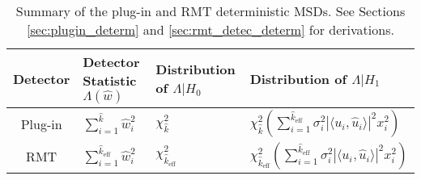 \begin{table*}[ht!]
\centering
\begin{tabular}{clll}\toprule
 Detector & Detector Statistic $\Lambda(\widehat{w})$  & Distribution of $\Lambda|H_0$ & Distribution of $\Lambda|H_1$\\
\midrule
Plug-in & $\sum_{i=1}^{\widehat{k}}\widehat{w}_i^2$ & $\chi^2_{\widehat{k}}$ & $\chi^2_{\widehat{k}}\left(\sum_{i=1}^{\widehat{k}_{\text{eff}}}\sigma_i^2|\langle u_i,\widehat{u}_i\rangle|^2x_i^2\right)$\\
 RMT& $\sum_{i=1}^{\widehat{k}_{\text{eff}}}\widehat{w}_i^2$ & $\chi^2_{\widehat{k}_{\text{eff}}}$ & $\chi^2_{\widehat{k}_{\text{eff}}}\left(\sum_{i=1}^{\widehat{k}_{\text{eff}}}\sigma_i^2|\langle u_i,\widehat{u}_i\rangle|^2x_i^2\right)$\\
\bottomrule
\end{tabular}
\caption{Summary of the plug-in and RMT deterministic MSDs. See Sections \ref{sec:plugin_determ} and \ref{sec:rmt_detec_determ} for derivations.}\vskip-0.2cm
\label{table:summary_determ}
\vspace{-0.3in}
\end{table*}



